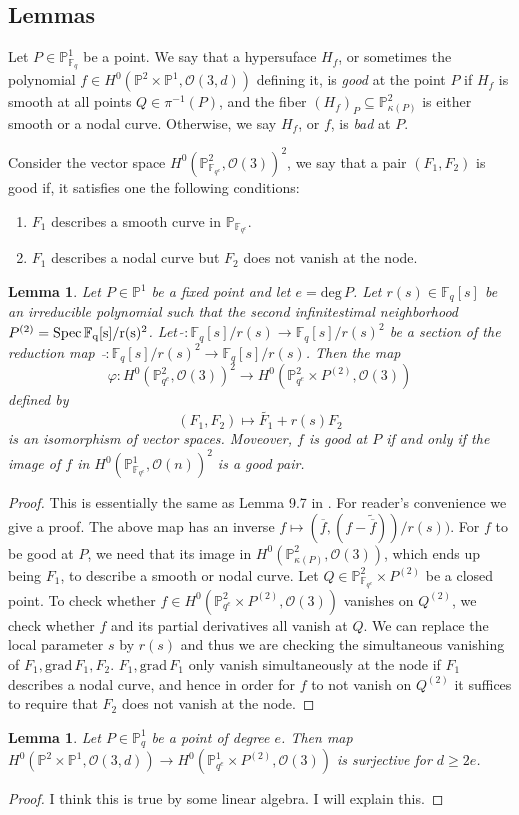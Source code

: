 \documentclass[12pt]{article}
\theoremstyle{plain}
\newtheorem{lemma}[equation]{Lemma}
\theoremstyle{definition}
\newcommand{\IF}{\mathbb{F}}
\newcommand{\IP}{\mathbb{P}}
\newcommand{\sO}{\mathcal{O}}
\renewcommand{\deg}{\mathrm{deg}\,}
\newcommand{\Spec}{\rm Spec\,}
\newcommand{\<}{\langle}
\renewcommand{\>}{\rangle}
\def\wt{\widetilde}
\newcommand{\grad}{\mathrm{grad}\,}
\begin{document}
\subsection{Lemmas}
Let $P \in \IP^1_{\IF_q}$ be a point. We say that a hypersuface $H_f$, or sometimes the polynomial $f \in H^0(\IP^2 \times \IP^1, \sO(3, d))$ defining it, is \textit{good} at the point $P$ if $H_f$ is smooth at all points $Q \in \pi^{-1}(P)$, and the fiber $(H_f)_P \subseteq \IP^2_{\kappa(P)}$ is either smooth or a nodal curve. Otherwise, we say $H_f$, or $f$, is \textit{bad} at $P$.  

Consider the vector space $H^0(\IP^2_{\IF_{q^e}}, \sO(3))^2$, we say that a pair $(F_1, F_2)$ is good if, it satisfies one the following conditions:
\begin{enumerate}
\item $F_1$ describes a smooth curve in $\IP_{\IF_{q^e}}$.
\item $F_1$ describes a nodal curve but $F_2$ does not vanish at the node.
\end{enumerate}  

\begin{lemma}
Let $P \in \IP^1$ be a fixed point and let $e = \deg P$. Let $r(s) \in \IF_q[s]$ be an irreducible polynomial such that the second infinitestimal neighborhood $P^{(2)} = \Spec \IF_q[s]/r(s)^2$. Let $\, \wt{} : \IF_q[s]/r(s) \to \IF_q[s]/r(s)^2$ be a section of the reduction map $\, \bar{} : \IF_q[s]/r(s)^2 \to \IF_q[s]/r(s)$. Then the map
$$ \varphi : H^0(\IP^2_{q^e} , \sO(3))^2 \to H^0(\IP^2_{q^e} \times P^{(2)}, \sO(3))$$ defined by 
$$ (F_1, F_2) \mapsto \wt{F_1} + r(s) F_2 $$
is an isomorphism of vector spaces. Moveover, $f$ is good at $P$ if and only if the image of $f$ in $H^0(\IP^1_{\IF_{q^e}} , \sO(n))^2$ is a good pair. 
\end{lemma}
\begin{proof}
This is essentially the same as Lemma 9.7 in \cite{Wood}. For reader's convenience we give a proof. The above map has an inverse $f \mapsto (\overline{f}, (f - \wt{\overline{f}}))/r(s))$. For $f$ to be good at $P$, we need that its image in $H^0(\IP^2_{\kappa(P)}, \sO(3))$, which ends up being $F_1$, to describe a smooth or nodal curve. Let $Q \in \IP^2_{\IF_{q^e}} \times P^{(2)}$ be a closed point. To check whether $f \in H^0(\IP^2_{q^e} \times P^{(2)}, \sO(3))$ vanishes on $Q^{(2)}$, we check whether $f$ and its partial derivatives all vanish at $Q$. We can replace the local parameter $s$ by $r(s)$ and thus we are checking the simultaneous vanishing of $F_1, \grad F_1, F_2$. $F_1, \grad F_1$ only vanish simultaneously at the node if $F_1$ describes a nodal curve, and hence in order for $f$ to not vanish on $Q^{(2)}$ it suffices to require that $F_2$ does not vanish at the node. 
\end{proof}
\begin{lemma}
\label{pointsurj}
Let $P \in \IP^1_q$ be a point of degree $e$. Then map $H^0(\IP^2 \times \IP^1, \sO(3, d)) \to H^0(\IP^1_{q^e} \times P^{(2)}, \sO(3))$ is surjective for $d \ge 2e$. 
\end{lemma}
\begin{proof}
I think this is true by some linear algebra. I will explain this. 
\end{proof}
\end{document}
